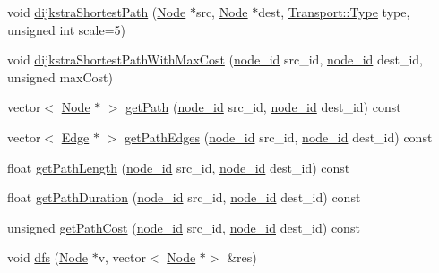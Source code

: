 \begin{DoxyCompactItemize}
\item 
void \hyperlink{class_graph_afe77f6a03cad266807c741d1a3178541}{dijkstra\+Shortest\+Path} (\hyperlink{class_node}{Node} $\ast$src, \hyperlink{class_node}{Node} $\ast$dest, \hyperlink{class_transport_a1879cecfed0d4238e5a7af6d085db317}{Transport\+::\+Type} type, unsigned int scale=5)
\item 
void \hyperlink{class_graph_a284736e6b467032dce3bfd69213c31f0}{dijkstra\+Shortest\+Path\+With\+Max\+Cost} (\hyperlink{_node_8hpp_a9d6265804805c2375068fd7484840dc6}{node\+\_\+id} src\+\_\+id, \hyperlink{_node_8hpp_a9d6265804805c2375068fd7484840dc6}{node\+\_\+id} dest\+\_\+id, unsigned max\+Cost)
\item 
vector$<$ \hyperlink{class_node}{Node} $\ast$ $>$ \hyperlink{class_graph_ae4c66eaf1b29f53bf90ad6266baa6819}{get\+Path} (\hyperlink{_node_8hpp_a9d6265804805c2375068fd7484840dc6}{node\+\_\+id} src\+\_\+id, \hyperlink{_node_8hpp_a9d6265804805c2375068fd7484840dc6}{node\+\_\+id} dest\+\_\+id) const
\item 
vector$<$ \hyperlink{class_edge}{Edge} $\ast$ $>$ \hyperlink{class_graph_a94db80dbb52cac57e2b5d14c53e649e7}{get\+Path\+Edges} (\hyperlink{_node_8hpp_a9d6265804805c2375068fd7484840dc6}{node\+\_\+id} src\+\_\+id, \hyperlink{_node_8hpp_a9d6265804805c2375068fd7484840dc6}{node\+\_\+id} dest\+\_\+id) const
\item 
float \hyperlink{class_graph_adb19e47c0238b012a6a3a28bdaf855f8}{get\+Path\+Length} (\hyperlink{_node_8hpp_a9d6265804805c2375068fd7484840dc6}{node\+\_\+id} src\+\_\+id, \hyperlink{_node_8hpp_a9d6265804805c2375068fd7484840dc6}{node\+\_\+id} dest\+\_\+id) const
\item 
float \hyperlink{class_graph_a2d69a99fb35fee10aadc243c468ad9b2}{get\+Path\+Duration} (\hyperlink{_node_8hpp_a9d6265804805c2375068fd7484840dc6}{node\+\_\+id} src\+\_\+id, \hyperlink{_node_8hpp_a9d6265804805c2375068fd7484840dc6}{node\+\_\+id} dest\+\_\+id) const
\item 
unsigned \hyperlink{class_graph_a9d5ab1a266d948f146e78866ef19673d}{get\+Path\+Cost} (\hyperlink{_node_8hpp_a9d6265804805c2375068fd7484840dc6}{node\+\_\+id} src\+\_\+id, \hyperlink{_node_8hpp_a9d6265804805c2375068fd7484840dc6}{node\+\_\+id} dest\+\_\+id) const
\item 
void \hyperlink{class_graph_ab596c4b805ecdf622c4f3d952f894a50}{dfs} (\hyperlink{class_node}{Node} $\ast$v, vector$<$ \hyperlink{class_node}{Node} $\ast$$>$ \&res)
\end{DoxyCompactItemize}


